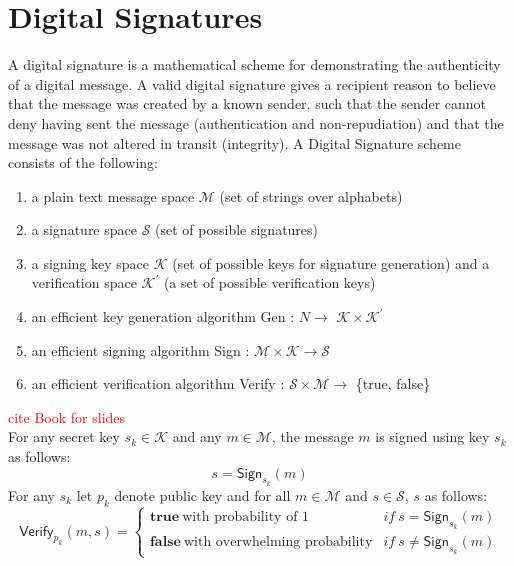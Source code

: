 \section{Digital Signatures}
	A digital signature is a mathematical scheme for demonstrating the authenticity of a digital message. 
	A valid digital signature gives a recipient reason to believe that the message was created by a known sender, such that the sender cannot deny having sent the message (authentication and non-repudiation) and that the message was not altered in transit (integrity).
	A Digital Signature scheme consists of the following:
	\begin{enumerate}
		\item a plain text message space $\mathcal{M}$ (set of strings over alphabets)
		\item a signature space $\mathcal{S}$ (set of possible signatures)
		\item a signing key space $\mathcal{K}$ (set of possible keys for signature generation) and a verification space $\mathcal{K^{'}}$ (a set of possible verification keys)
		\item an efficient key generation algorithm \textsf{Gen} : $N \rightarrow$ $\mathcal{K} \times \mathcal{K^{'}} $ 
		\item an efficient signing algorithm \textsf{Sign} : $ \mathcal{M} \times \mathcal{K} \rightarrow \mathcal{S}$
		\item an efficient verification algorithm \textsf{Verify} : $\mathcal{S} \times \mathcal{M} \rightarrow$ \{true, false\} 
	\end{enumerate}
	\textcolor{red}{cite Book for slides}\\
	For any secret key $s_{k} \in \mathcal{K}$ and any $m \in \mathcal{M}$,	the message $m$ is signed using key $s_{k}$ as follows:
		\begin{equation}
			s = \textsf{Sign}_{s_{k}}(m)
			\label{eq:signature}
		\end{equation}
	For any $s_{k}$ let $p_{k}$ denote public key and for all $m \in \mathcal{M}$ and $s \in \mathcal{S}$, $s$ as follows:
	\begin{equation}
		\textsf{Verify}_{p_{k}}(m,s) = 
		\begin{cases}
		 \textbf{true}\ \mbox{with probability of 1} & if\ s = \textsf{Sign}_{s_{k}}(m)\\
		 \textbf{false}\ \mbox{with overwhelming probability} & if\ s \neq \textsf{Sign}_{s_{k}}(m)
		\end{cases}
		\label{eq:verification}
	\end{equation}
